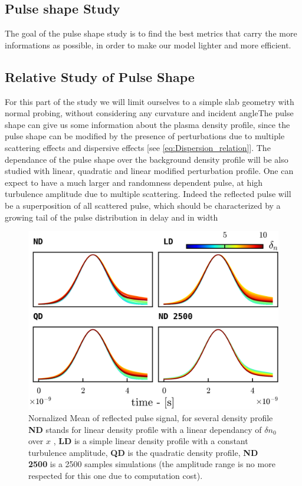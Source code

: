 \documentclass[11pt,a4paper,openany]{report}
\begin{document}
\begin{multicols}{2}
    \section{Pulse shape Study}
    The goal of the pulse shape study is to find the best metrics that carry the more informations as possible, in order to make our model lighter and more efficient.
    \subsection{Relative Study of Pulse Shape}

    For this part of the study we will limit ourselves to a simple slab geometry with normal probing, without considering any curvature and incident angleThe pulse shape can give us some information about the plasma density profile, since the pulse shape can be modified by the presence of perturbations due to multiple scattering effects and dispersive effects [see \ref{eq:Dispersion_relation}].
    The dependance of the pulse shape over the background density profile will be also studied with linear, quadratic and linear modified perturbation profile. One can expect to have a much larger and randomness dependent pulse, at high turbulence amplitude due to multiple scattering. Indeed the reflected pulse will be a superposition of all scattered pulse, which should be characterized by a growing tail of the pulse distribution in delay and in width
    \begin{figure}[H]
        \centering
        \includegraphics[width=1\linewidth]{./figures/pulse_shape.png}
        \caption{Nornalized Mean of reflected pulse signal, for several density profile \textbf{ND} stands for linear density profile with a linear dependancy of $\delta n_0$ over $x$  , \textbf{LD} is a simple linear density profile with a constant turbulence amplitude, \textbf{QD} is the quadratic density profile, \textbf{ND 2500} is a 2500 samples simulations (the amplitude range is no more respected for this one due to computation cost). }


\end{figure}
\end{multicols}
\end{document}
